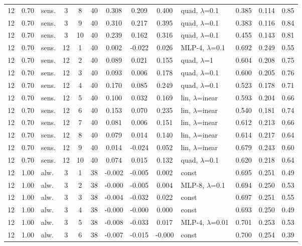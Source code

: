 \documentclass[10pt]{article}
\begin{document}
\begin{scriptsize}
\begin{longtable}{cclcc c ccc l ccc}
12 & 0.70 & sens. & 3 & 8 & 40 & 0.308 & 0.209 & 0.400 & quad, $\lambda$=0.1 & 0.385 & 0.114 & 0.85 \\
12 & 0.70 & sens. & 3 & 9 & 40 & 0.310 & 0.217 & 0.395 & quad, $\lambda$=0.1 & 0.383 & 0.116 & 0.84 \\
12 & 0.70 & sens. & 3 & 10 & 40 & 0.239 & 0.162 & 0.316 & quad, $\lambda$=0.1 & 0.455 & 0.143 & 0.81 \\
12 & 0.70 & sens. & 12 & 1 & 40 & 0.002 & -0.022 & 0.026 & MLP-4, $\lambda$=0.1 & 0.692 & 0.249 & 0.55 \\
12 & 0.70 & sens. & 12 & 2 & 40 & 0.089 & 0.021 & 0.155 & quad, $\lambda$=1 & 0.604 & 0.208 & 0.75 \\
12 & 0.70 & sens. & 12 & 3 & 40 & 0.093 & 0.006 & 0.178 & quad, $\lambda$=0.1 & 0.600 & 0.205 & 0.76 \\
12 & 0.70 & sens. & 12 & 4 & 40 & 0.170 & 0.085 & 0.249 & quad, $\lambda$=0.1 & 0.523 & 0.178 & 0.71 \\
12 & 0.70 & sens. & 12 & 5 & 40 & 0.100 & 0.032 & 0.169 & lin, $\lambda$=inear & 0.593 & 0.204 & 0.66 \\
12 & 0.70 & sens. & 12 & 6 & 40 & 0.153 & 0.070 & 0.235 & lin, $\lambda$=inear & 0.540 & 0.181 & 0.74 \\
12 & 0.70 & sens. & 12 & 7 & 40 & 0.081 & 0.006 & 0.151 & lin, $\lambda$=inear & 0.612 & 0.213 & 0.66 \\
12 & 0.70 & sens. & 12 & 8 & 40 & 0.079 & 0.014 & 0.140 & lin, $\lambda$=inear & 0.614 & 0.217 & 0.64 \\
12 & 0.70 & sens. & 12 & 9 & 40 & 0.014 & -0.024 & 0.052 & lin, $\lambda$=inear & 0.679 & 0.243 & 0.60 \\
12 & 0.70 & sens. & 12 & 10 & 40 & 0.074 & 0.015 & 0.132 & quad, $\lambda$=0.1 & 0.620 & 0.218 & 0.64 \\
12 & 1.00 & alw. & 3 & 1 & 38 & -0.002 & -0.005 & 0.002 & const & 0.695 & 0.251 & 0.49 \\
12 & 1.00 & alw. & 3 & 2 & 38 & -0.000 & -0.005 & 0.004 & MLP-8, $\lambda$=0.1 & 0.694 & 0.250 & 0.53 \\
12 & 1.00 & alw. & 3 & 3 & 38 & -0.004 & -0.032 & 0.022 & const & 0.697 & 0.251 & 0.55 \\
12 & 1.00 & alw. & 3 & 4 & 38 & -0.000 & -0.000 & 0.000 & const & 0.693 & 0.250 & 0.49 \\
12 & 1.00 & alw. & 3 & 5 & 38 & -0.008 & -0.033 & 0.017 & MLP-4, $\lambda$=0.01 & 0.701 & 0.253 & 0.53 \\
12 & 1.00 & alw. & 3 & 6 & 38 & -0.007 & -0.015 & -0.000 & const & 0.700 & 0.254 & 0.39 \\

\end{longtable}
\end{scriptsize}
\end{document}
